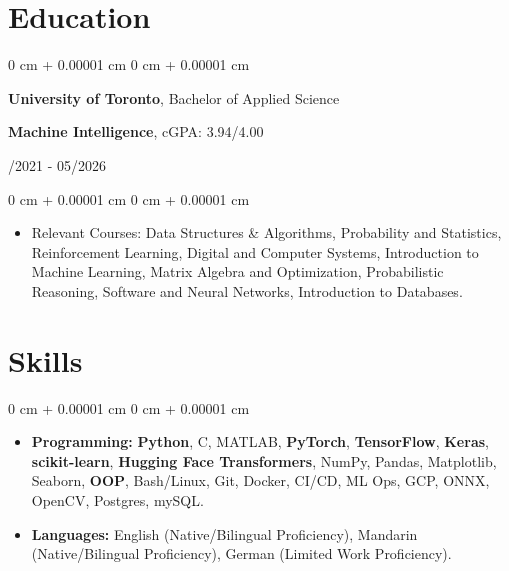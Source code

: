 \documentclass[10pt, letterpaper]{article}
\newenvironment{highlights}{
    \begin{itemize}[
        topsep=0.10 cm,
        parsep=0.10 cm,
        partopsep=0pt,
        itemsep=0pt,
        leftmargin=0 cm + 10pt
    ]
}{
    \end{itemize}
}
\newenvironment{onecolentry}{
    \begin{adjustwidth}{
        0 cm + 0.00001 cm
    }{
        0 cm + 0.00001 cm
    }
}{
    \end{adjustwidth}
}
\newenvironment{twocolentry}[2][]{
    \onecolentry
    \def\secondColumn{#2}
    \setcolumnwidth{\fill, 4.5 cm}
    \begin{paracol}{2}
}{
    \switchcolumn \raggedleft \secondColumn
    \end{paracol}
    \endonecolentry
}
\begin{document}
\section{Education}
\vspace{0.08 cm}
\begin{twocolentry}{09/2021 - 05/2026}
    {\textbf{University of Toronto}}, Bachelor of Applied Science  
    \item \textbf{Machine Intelligence}, cGPA: {3.94}/4.00
\end{twocolentry}
\vspace{0.10 cm}
\begin{onecolentry}
    \begin{highlights}
        \item Relevant Courses: Data Structures \& Algorithms, Probability and Statistics, Reinforcement Learning, Digital and Computer Systems, Introduction to Machine Learning, Matrix Algebra and Optimization, Probabilistic Reasoning, Software and Neural Networks, Introduction to Databases.
    \end{highlights}
\end{onecolentry}

\section{Skills}
\begin{onecolentry}
    \begin{highlights}
        \item \textbf{Programming:} \textbf{Python}, C, MATLAB, \textbf{PyTorch}, \textbf{TensorFlow}, \textbf{Keras}, \textbf{scikit-learn}, \textbf{Hugging Face Transformers}, NumPy, Pandas, Matplotlib, Seaborn, \textbf{OOP}, Bash/Linux, Git, Docker, CI/CD, ML Ops, GCP, ONNX, OpenCV, Postgres, mySQL.

        \item \textbf{Languages:} English (Native/Bilingual Proficiency), Mandarin (Native/Bilingual Proficiency), German (Limited Work Proficiency).
    \end{highlights}
\end{onecolentry}
\end{document}
